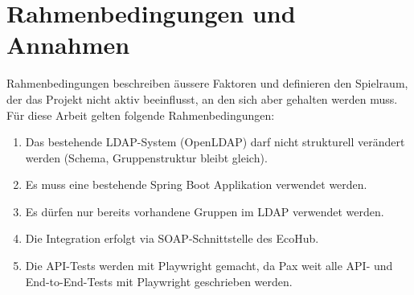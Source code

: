 \section{Rahmenbedingungen und Annahmen}
Rahmenbedingungen beschreiben äussere Faktoren und definieren den Spielraum, der das Projekt nicht aktiv beeinflusst, an den sich aber gehalten werden muss. Für diese Arbeit gelten folgende Rahmenbedingungen:

\begin{enumerate}
    \item Das bestehende LDAP-System (OpenLDAP) darf nicht strukturell verändert werden (Schema, Gruppenstruktur bleibt gleich).
    \item Es muss eine bestehende Spring Boot Applikation verwendet werden.
    \item Es dürfen nur bereits vorhandene Gruppen im LDAP verwendet werden.
    \item Die Integration erfolgt via SOAP-Schnittstelle des EcoHub.
    \item Die API-Tests werden mit Playwright gemacht, da Pax weit alle API- und End-to-End-Tests mit Playwright geschrieben werden.
\end{enumerate}
